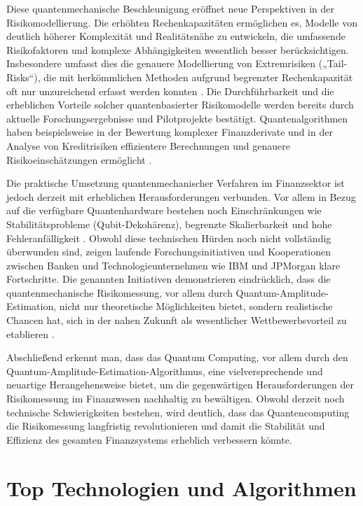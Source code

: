 Diese quantenmechanische Beschleunigung eröffnet neue Perspektiven in der Risikomodellierung. Die erhöhten Rechenkapazitäten ermöglichen es, Modelle von deutlich höherer Komplexität und Realitätsnähe zu entwickeln, die umfassende Risikofaktoren und komplexe Abhängigkeiten wesentlich besser berücksichtigen. Insbesondere umfasst dies die genauere Modellierung von Extremrisiken („Tail-Risks“), die mit herkömmlichen Methoden aufgrund begrenzter Rechenkapazität oft nur unzureichend erfasst werden konnten \cite{orus2019,orus2018}. Die Durchführbarkeit und die erheblichen Vorteile solcher quantenbasierter Risikomodelle werden bereits durch aktuelle Forschungsergebnisse und Pilotprojekte bestätigt. Quantenalgorithmen haben beispielsweise in der Bewertung komplexer Finanzderivate und in der Analyse von Kreditrisiken effizientere Berechnungen und genauere Risikoeinschätzungen ermöglicht \cite{egger2020,rebentrost2018}.

Die praktische Umsetzung quantenmechanischer Verfahren im Finanzsektor ist jedoch derzeit mit erheblichen Herausforderungen verbunden. Vor allem in Bezug auf die verfügbare Quantenhardware bestehen noch Einschränkungen wie Stabilitätsprobleme (Qubit-Dekohärenz), begrenzte Skalierbarkeit und hohe Fehleranfälligkeit \cite{bouland2020,martin2022}. Obwohl diese technischen Hürden noch nicht vollständig überwunden sind, zeigen laufende Forschungsinitiativen und Kooperationen zwischen Banken und Technologieunternehmen wie IBM und JPMorgan klare Fortschritte. Die genannten Initiativen demonstrieren eindrücklich, dass die quantenmechanische Risikomessung, vor allem durch Quantum-Amplitude-Estimation, nicht nur theoretische Möglichkeiten bietet, sondern realistische Chancen hat, sich in der nahen Zukunft als wesentlicher Wettbewerbsvorteil zu etablieren \cite{orus2019,martin2022}.

Abschließend erkennt man, dass das Quantum Computing, vor allem durch den Quantum-Amplitude-Estimation-Algorithmus, eine vielversprechende und neuartige Herangehensweise bietet, um die gegenwärtigen Herausforderungen der Risikomessung im Finanzwesen nachhaltig zu bewältigen. Obwohl derzeit noch technische Schwierigkeiten bestehen, wird deutlich, dass das Quantencomputing die Risikomessung langfristig revolutionieren und damit die Stabilität und Effizienz des gesamten Finanzsystems erheblich verbessern könnte.

\section{Top Technologien und Algorithmen}

